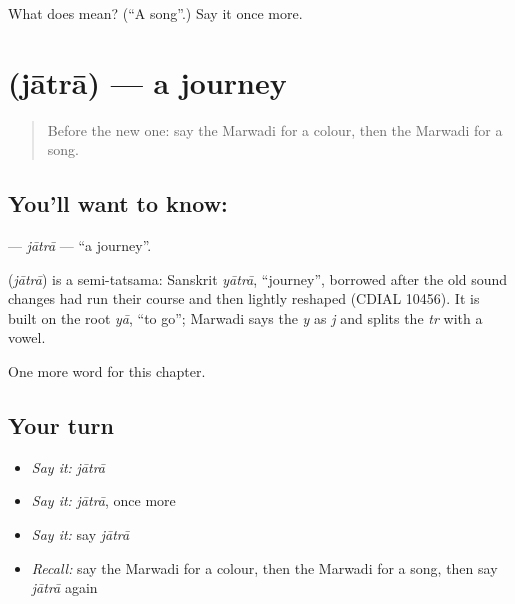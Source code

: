 \begin{tcolorbox}[breakable,colback=teal!4,colframe=teal!35!black,title={Before you move on}]
What does  mean? (\textquotedblleft{}A song\textquotedblright{}.) Say it once more.
\end{tcolorbox}
\section[\texorpdfstring{\mw{जातरा} (jātrā)}{जातरा (jātrā)}]{ (jātrā) — a journey}

\label{lesson:MW-C88-jatra}



\begin{quote}
Before the new one: say the Marwadi for a colour, then the Marwadi for a song.
\end{quote}

\subsection*{You'll want to know: }
\textbf{} — \emph{jātrā} — \textquotedblleft{}a journey\textquotedblright{}.

\begin{cousinweb}
\textbf{} (\emph{jātrā}) is a semi-tatsama: Sanskrit \emph{yātrā}, \textquotedblleft{}journey\textquotedblright{}, borrowed after the old sound changes had run their course and then lightly reshaped (CDIAL 10456). It is built on the root \emph{yā}, \textquotedblleft{}to go\textquotedblright{}; Marwadi says the \emph{y} as \emph{j} and splits the \emph{tr} with a vowel.
\end{cousinweb}

\begin{grammarlens}[title={What you've built}]
One more word for this chapter.
\end{grammarlens}

\subsection*{Your turn}
\begin{itemize}
\raggedright
  \item \emph{Say it:} \emph{jātrā}
  \item \emph{Say it:} \emph{jātrā}, once more
  \item \emph{Say it:} say \emph{jātrā}
  \item \emph{Recall:} say the Marwadi for a colour, then the Marwadi for a song, then say \emph{jātrā} again
\end{itemize}

